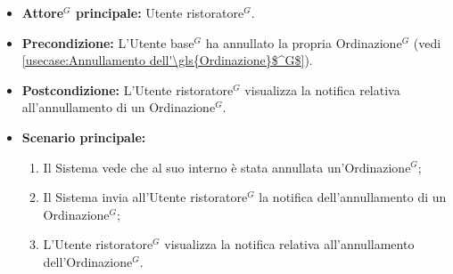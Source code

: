 \label{usecase:Visualizzazione notifica annullamento \gls{Ordine}$^G$}
\begin{itemize}
	\item \textbf{\gls{Attore}$^G$ principale:} \gls{Utente ristoratore}$^G$.

	\item \textbf{Precondizione:} L'\gls{Utente base}$^G$ ha annullato la propria \gls{Ordinazione}$^G$ (vedi \autoref{usecase:Annullamento dell'\gls{Ordinazione}$^G$}).

	\item \textbf{Postcondizione:} L'\gls{Utente ristoratore}$^G$ visualizza la notifica relativa all'annullamento di un \gls{Ordinazione}$^G$.

	\item \textbf{Scenario principale:}
	      \begin{enumerate}
		      \item Il Sistema vede che al suo interno è stata annullata un'\gls{Ordinazione}$^G$;
		      \item Il Sistema invia all'\gls{Utente ristoratore}$^G$ la notifica dell'annullamento di un \gls{Ordinazione}$^G$;
		      \item L'\gls{Utente ristoratore}$^G$ visualizza la notifica relativa all'annullamento dell'\gls{Ordinazione}$^G$.
	      \end{enumerate}
\end{itemize}

